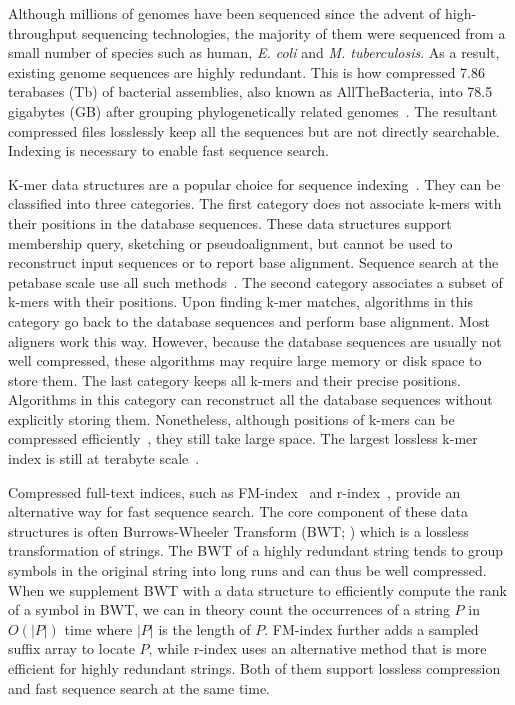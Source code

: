 \documentclass[webpdf,contemporary,large,namedate]{oup-authoring-template}%
\begin{document}
Although millions of genomes have been sequenced since the advent of high-throughput sequencing technologies,
the majority of them were sequenced from a small number of species such as human, \emph{E. coli} and \emph{M. tuberculosis}.
As a result, existing genome sequences are highly redundant.
This is how \citet{Hunt2024.03.08.584059} compressed 7.86 terabases (Tb) of bacterial assemblies, also known as AllTheBacteria, into 78.5 gigabytes (GB)
after grouping phylogenetically related genomes~\citep{Brinda:2024aa}.
The resultant compressed files losslessly keep all the sequences but are not directly searchable.
Indexing is necessary to enable fast sequence search.

K-mer data structures are a popular choice for sequence indexing~\citep{Marchet:2021aa}.
They can be classified into three categories.
The first category does not associate k-mers with their positions in the database sequences.
These data structures support membership query, sketching or pseudoalignment,
but cannot be used to reconstruct input sequences or to report base alignment.
Sequence search at the petabase scale use all such methods~\citep{Edgar:2022aa,Karasikov2020.10.01.322164,Shiryev:2024aa}.
The second category associates a subset of k-mers with their positions.
Upon finding k-mer matches, algorithms in this category go back to the database sequences and perform base alignment.
Most aligners work this way.
However, because the database sequences are usually not well compressed,
these algorithms may require large memory or disk space to store them.
The last category keeps all k-mers and their precise positions.
Algorithms in this category can reconstruct all the database sequences without explicitly storing them.
Nonetheless, although positions of k-mers can be compressed efficiently~\citep{Karasikov:2020aa},
they still take large space.
The largest lossless k-mer index is still at terabyte scale~\citep{Karasikov2020.10.01.322164}.

Compressed full-text indices, such as FM-index~\citep{DBLP:conf/focs/FerraginaM00} and r-index~\citep{DBLP:conf/soda/GagieNP18,DBLP:journals/tcs/BannaiGI20,DBLP:journals/jacm/GagieNP20},
provide an alternative way for fast sequence search.
The core component of these data structures is often Burrows-Wheeler Transform (BWT; \citealt*{Burrows:1994aa})
which is a lossless transformation of strings.
The BWT of a highly redundant string tends to group symbols in the original string into long runs
and can thus be well compressed.
When we supplement BWT with a data structure to efficiently compute the rank of a symbol in BWT,
we can in theory count the occurrences of a string $P$ in $O(|P|)$ time where $|P|$ is the length of $P$.
FM-index further adds a sampled suffix array to locate $P$,
while r-index uses an alternative method that is more efficient for highly redundant strings.
Both of them support lossless compression and fast sequence search at the same time.
\end{document}
